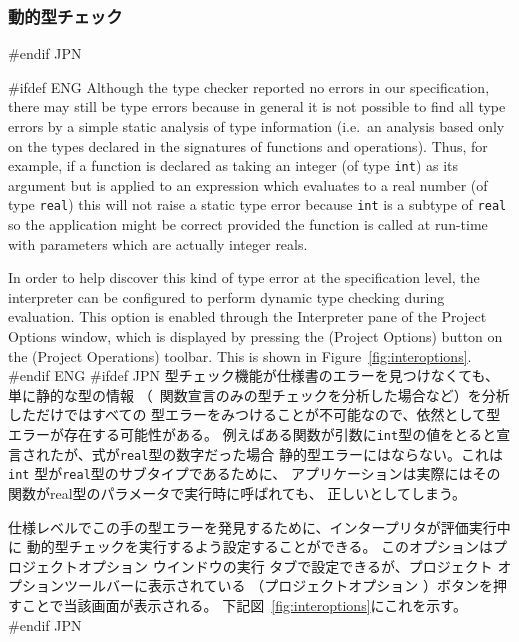 \documentclass[\pformat,12pt]{article}
\newcommand{\aaa}{\tt }
\newcommand{\guicmd}[1]{{\sf #1}}
\newcommand{\guicmd}[1]{{\gt #1}}
\begin{document}
\subsubsection{動的型チェック}
#endif JPN

#ifdef ENG
Although the type checker reported no errors in our specification,
there may still be type errors because in general it is not possible
to find all type errors by a simple static analysis of type
information (i.e.\ an analysis based only on the types declared in the
signatures of functions and operations). Thus, for example, if a
function is declared as taking an integer (of type {\aaa int}) as its
argument but is applied to an expression which evaluates to a real
number (of type {\aaa real}) this will not raise a static type error
because {\aaa int} is a subtype of {\aaa real} so the application
might be correct provided the function is called at run-time with
parameters which are actually integer reals.

In order to help discover this kind of type error at the specification
level, the interpreter can be configured to perform dynamic type
checking during evaluation.  This option is enabled through the
\guicmd{Interpreter} pane of the \guicmd{Project Options} window, 
which is displayed by pressing the
(\guicmd{Project Options}) button on the (\guicmd{Project Operations})
toolbar. This is shown in Figure~\ref{fig:interoptions}.
#endif ENG
#ifdef JPN
型チェック機能が仕様書のエラーを見つけなくても、単に静的な型の情報
（\ 関数宣言のみの型チェックを分析した場合など）を分析しただけではすべての
型エラーをみつけることが不可能なので、依然として型エラーが存在する可能性がある。
例えばある関数が引数に{\aaa int}型の値をとると宣言されたが、式が{\aaa real}型の数字だった場合
静的型エラーにはならない。これは{\aaa int} 型が{\aaa real}型のサブタイプであるために、
アプリケーションは実際にはその関数がreal型のパラメータで実行時に呼ばれても、
正しいとしてしまう。

仕様レベルでこの手の型エラーを発見するために、インタープリタが評価実行中に
動的型チェックを実行するよう設定することができる。
このオプションは\guicmd{プロジェクトオプション} ウインドウの\guicmd{実行} タブで設定できるが、プロジェクト
オプションツールバーに表示されている 
 （\guicmd{プロジェクトオプション} ）ボタンを押すことで当該画面が表示される。
下記図~\ref{fig:interoptions}にこれを示す。
#endif JPN
\end{document}
